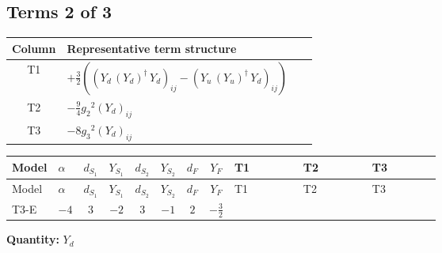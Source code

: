 \documentclass[8pt]{article}
\begin{document}
\begin{landscape}
\subsection*{Terms 2 of 3}
\begin{center}
\begin{tabular}{@{}c >{\raggedright\arraybackslash}p{0.82\linewidth}@{}}
\toprule
Column & Representative term structure \\
\midrule
T1 & \(\displaystyle +\frac{3}{2} (\left({Y_d}\,\left({Y_d}\right)^{\dagger}\,{Y_d}\right)_{ij}-\left({Y_u}\,\left({Y_u}\right)^{\dagger}\,{Y_d}\right)_{ij})\) \\
\midrule
T2 & \(\displaystyle -\frac{9}{4} {g_2}^2 \left({Y_d}\right)_{ij}\) \\
\midrule
T3 & \(\displaystyle -8 {g_3}^2 \left({Y_d}\right)_{ij}\) \\
\midrule
\bottomrule
\end{tabular}
\end{center}
\smallskip
\tiny
\begin{longtable}{@{}llcccccc >{\raggedright\arraybackslash}p{0.21\linewidth} >{\raggedright\arraybackslash}p{0.21\linewidth} >{\raggedright\arraybackslash}p{0.21\linewidth}@{}}
\toprule
Model & $\alpha$ & $d_{S_1}$ & $Y_{S_1}$ & $d_{S_2}$ & $Y_{S_2}$ & $d_F$ & $Y_F$ & T1 & T2 & T3 \\
\midrule
\endfirsthead
\toprule
Model & $\alpha$ & $d_{S_1}$ & $Y_{S_1}$ & $d_{S_2}$ & $Y_{S_2}$ & $d_F$ & $Y_F$ & T1 & T2 & T3 \\
\midrule
\endhead
T3-E & $-4$ & $3$ & $-2$ & $3$ & $-1$ & $2$ & $-\frac{3}{2}$ & \scriptsize\adjustbox{max width=\linewidth}{$\begin{gathered} +\frac{3}{2} (\left({Y_d}\,\left({Y_d}\right)^{\dagger}\,{Y_d}\right)_{ij}-\left({Y_u}\,\left({Y_u}\right)^{\dagger}\,{Y_d}\right)_{ij})\end{gathered}$} & \scriptsize\adjustbox{max width=\linewidth}{$\begin{gathered} -\frac{9}{4} {g_2}^2 \left({Y_d}\right)_{ij}\end{gathered}$} & \scriptsize\adjustbox{max width=\linewidth}{$\begin{gathered} -8 {g_3}^2 \left({Y_d}\right)_{ij}\end{gathered}$} \\
\midrule
\bottomrule
\end{longtable}
\clearpage
\noindent\textbf{Quantity: }$Y_d$\par\smallskip

\end{landscape}
\end{document}

